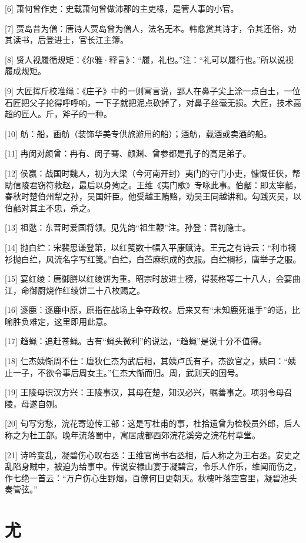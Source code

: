 \documentclass[12pt,UTF8]{ctexbook}
\begin{document}
[6] 萧何曾作吏：史载萧何曾做沛郡的主吏椽，是管人事的小官。

[7] 贾岛昔为僧：唐诗人贾岛曾为僧人，法名无本。韩愈赏其诗才，令其还俗，劝其读书，后登进士，官长江主簿。

[8] 贤人视履循规矩：《尔雅·释言》：“履，礼也。”注：“礼可以履行也。”所以说视履成规矩。

[9] 大匠挥斤校准绳：《庄子》中的一则寓言说，郢人在鼻子尖上涂一点白土，一位石匠把父子抡得呼呼响，一下子就把泥点砍掉了，对鼻子丝毫无损。大匠，技术高超的匠人。斤，斧子的一种。

[10] 舫：船，画舫（装饰华美专供旅游用的船）；酒舫，载酒或卖酒的船。

[11] 冉闵对颜曾：冉有、闵子骞、颜渊、曾参都是孔子的高足弟子。

[12] 侯嬴：战国时魏人，初为大梁（今河南开封）夷门的守门小吏，慷慨任侠，帮助信陵君窃符救赵，最后以身殉之。王维《夷门歌》专咏此事。伯嚭：即太宰嚭，春秋时楚伯州犁之孙，吴国奸臣。他受越王贿赂，劝吴王同越讲和。勾践灭吴，以伯嚭对其主不忠，杀之。

[13] 祖逖：东晋时爱国将领。见先韵“祖生鞭”注。孙登：晋初隐士。

[14] 抛白纻：宋裴思谦登第，以红笺数十幅入平康赋诗。王元之有诗云：“利市襕衫抛白纻，风流名字写红笺。”白纻，白苎麻织成的衣服。白纻襕衫，唐举子之服。

[15] 宴红绫：唐御膳以红绫饼为重。昭宗时放进士榜，得裴格等二十八人，会宴曲江，命御厨烧作红绫饼二十八枚赐之。

[16] 逐鹿：逐鹿中原，原指在战场上争夺政权。后来又有“未知鹿死谁手”的话，比喻胜负难定，这里即用此意。

[17] 趋蝇：追赶苍蝇。古有“蝇头微利”的说法，“趋蝇”是说十分不值得。

[18] 仁杰姨惭周不仕：唐狄仁杰为武后相，其姨卢氏有子，杰欲官之，姨曰：“姨止一子，不欲令事后周女主。”仁杰大惭而归。周，武则天的国号。

[19] 王陵母识汉方兴：王陵事汉，其母在楚，知汉必兴，嘱善事之。项羽令母召陵，母遂自刎。

[20] 句写穷愁，浣花寄迹传工部：这是写杜甫的事，杜拾遗曾为检校员外郎，后人称之为杜工部。晚年流落蜀中，寓居成都西郊浣花溪旁之浣花村草堂。

[21] 诗吟变乱，凝碧伤心叹右丞：王维官尚书右丞相，后人称之为王右丞。安史之乱陷身贼中，被迫为给事中。传说安禄山宴于凝碧宫，令乐人作乐，维闻而伤之，作七绝一首云：“万户伤心生野烟，百僚何日更朝天。秋槐叶落空宫里，凝碧池头奏管弦。”





\chapter{尤}
\end{document}
